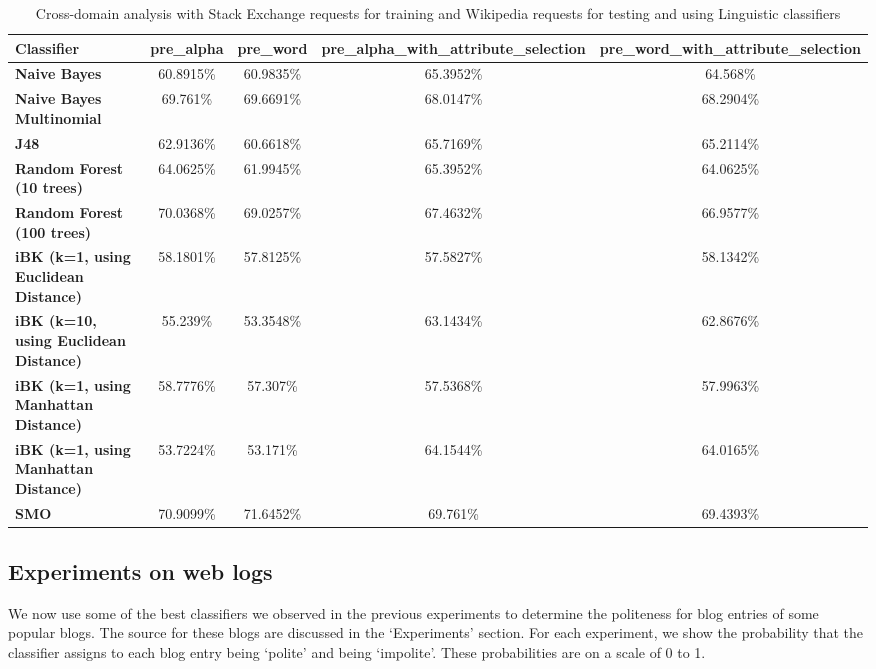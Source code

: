 \documentclass[conference]{IEEEtran}
\begin{document}
\begin{table*}[htbp]
\caption{Cross-domain analysis with Stack Exchange requests for training and Wikipedia requests for testing and using Linguistic classifiers }
\centering
\vspace{5pt}
\begin{tabular}{|l|c|c|c|c|}
\hline
\textbf{Classifier} & \textbf{pre\_alpha} & \textbf{pre\_word} & \textbf{pre\_alpha\_with\_attribute\_selection} & \textbf{pre\_word\_with\_attribute\_selection} \\
\hline\hline
\textbf{Naive Bayes} & 60.8915\% & 60.9835\% & 65.3952\% & 64.568\% \\ 
\hline
\textbf{Naive Bayes Multinomial} & 69.761\% & 69.6691\% & 68.0147\% & 68.2904\% \\ 
\hline
\textbf{J48} & 62.9136\% & 60.6618\% & 65.7169\% & 65.2114\% \\ 
\hline
\textbf{Random Forest (10 trees)} & 64.0625\% & 61.9945\% & 65.3952\% & 64.0625\% \\ 
\hline
\textbf{Random Forest (100 trees)} & 70.0368\% & 69.0257\% & 67.4632\% & 66.9577\% \\ 
\hline
\textbf{iBK (k=1, using Euclidean Distance)} & 58.1801\% & 57.8125\% & 57.5827\% & 58.1342\% \\ 
\hline
\textbf{iBK (k=10, using Euclidean Distance)} & 55.239\% & 53.3548\% & 63.1434\% & 62.8676\% \\ 
\hline
\textbf{iBK (k=1, using Manhattan Distance)} & 58.7776\% & 57.307\% & 57.5368\% & 57.9963\% \\ 
\hline
\textbf{iBK (k=1, using Manhattan Distance)} & 53.7224\% & 53.171\% & 64.1544\% & 64.0165\% \\ 
\hline
\textbf{SMO} & 70.9099\% & 71.6452\% & 69.761\% & 69.4393\% \\ 
\hline
\hline
\end{tabular}
\label{table:cross-domain-stack-Ling}
\end{table*}

\subsection{Experiments on web logs}

We now use some of the best classifiers we observed in the previous experiments to determine the politeness for blog entries of some popular blogs. The source for these blogs are discussed in the `Experiments' section. For each experiment, we show the probability that the classifier assigns to each blog entry being `polite' and being `impolite'. These probabilities are on a scale of 0 to 1.
\end{document}
